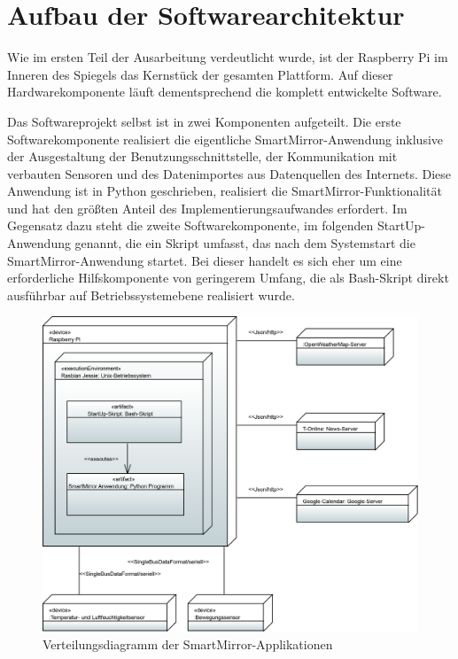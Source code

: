 \section{Aufbau der Softwarearchitektur}
Wie im ersten Teil der Ausarbeitung verdeutlicht wurde, ist der Raspberry Pi im Inneren des Spiegels das Kernstück der gesamten Plattform. Auf dieser Hardwarekomponente läuft dementsprechend die komplett entwickelte Software. 

Das Softwareprojekt selbst ist in zwei Komponenten aufgeteilt. Die erste Softwarekomponente realisiert die eigentliche SmartMirror-Anwendung inklusive der Ausgestaltung der Benutzungsschnittstelle, der Kommunikation mit verbauten Sensoren und des Datenimportes aus Datenquellen des Internets. Diese Anwendung ist in Python geschrieben, realisiert die SmartMirror-Funktionalität und hat den größten Anteil des Implementierungsaufwandes erfordert. Im Gegensatz dazu steht die zweite Softwarekomponente, im folgenden StartUp-Anwendung genannt, die ein Skript umfasst, das nach dem Systemstart die SmartMirror-Anwendung startet. Bei dieser handelt es sich eher um eine erforderliche Hilfskomponente von geringerem Umfang, die als Bash-Skript direkt ausführbar auf Betriebssystemebene realisiert wurde.  

\begin{figure}
	\centering
	\includegraphics[width=0.8\linewidth]{bilder/DeploymentDiagram}
	\caption[Verteilungsdiagramm der SmartMirror-Applikationen]{Verteilungsdiagramm der SmartMirror-Applikationen}
	\label{fig:verteilungsdiagramm}
\end{figure}

